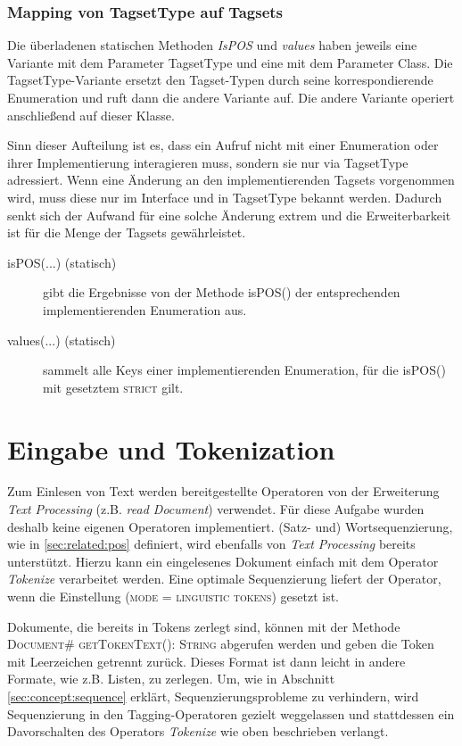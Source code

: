 \subsubsection{Mapping von TagsetType auf Tagsets}

Die überladenen statischen Methoden \textit{IsPOS} und \textit{values} haben jeweils eine Variante mit dem Parameter TagsetType und eine mit dem Parameter Class. Die TagsetType-Variante ersetzt den Tagset-Typen durch seine korrespondierende Enumeration und ruft dann die andere Variante auf. Die andere Variante operiert anschließend auf dieser Klasse.

Sinn dieser Aufteilung ist es, dass ein Aufruf nicht mit einer Enumeration oder ihrer Implementierung interagieren muss, sondern sie nur via TagsetType adressiert. Wenn eine Änderung an den implementierenden Tagsets vorgenommen wird, muss diese nur im Interface und in TagsetType bekannt werden. Dadurch senkt sich der Aufwand für eine solche Änderung extrem und die Erweiterbarkeit ist für die Menge der Tagsets gewährleistet.

\begin{description}
\item[isPOS(...) (statisch)] gibt die Ergebnisse von der Methode isPOS() der entsprechenden implementierenden Enumeration aus.
\item[values(...) (statisch)] sammelt alle Keys einer implementierenden Enumeration, für die isPOS() mit gesetztem \textsc{strict} gilt.
\end{description}

\section{Eingabe und Tokenization}
Zum Einlesen von Text werden bereitgestellte Operatoren von der Erweiterung \textit{Text Processing} (z.B. \textit{read Document}) verwendet. Für diese Aufgabe wurden deshalb keine eigenen Operatoren implementiert. (Satz- und) Wortsequenzierung, wie in \ref{sec:related:pos} definiert, wird ebenfalls von \textit{Text Processing} bereits unterstützt. Hierzu kann ein eingelesenes Dokument einfach mit dem Operator \textit{Tokenize} verarbeitet werden. Eine optimale Sequenzierung liefert der Operator, wenn die Einstellung \textsc{(mode = linguistic tokens)} gesetzt ist.

 Dokumente, die bereits in Tokens zerlegt sind, können mit der Methode \textsc{Document\# getTokenText(): String} abgerufen werden und geben die Token mit Leerzeichen getrennt zurück. Dieses Format ist dann leicht in andere Formate, wie z.B. Listen, zu zerlegen. Um, wie in Abschnitt \ref{sec:concept:sequence} erklärt, Sequenzierungsprobleme zu verhindern, wird Sequenzierung in den Tagging-Operatoren gezielt weggelassen und stattdessen ein Davorschalten des Operators \textit{Tokenize} wie oben beschrieben verlangt.


